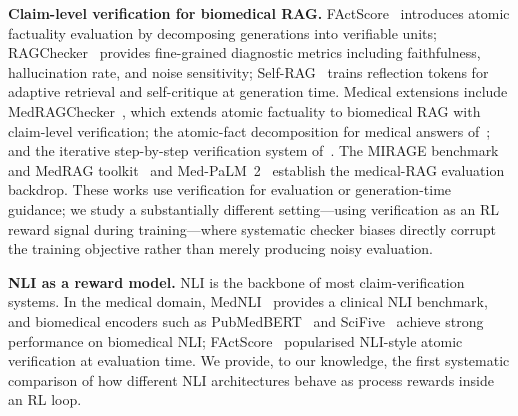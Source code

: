 \documentclass[11pt]{article}
\begin{document}
\textbf{Claim-level verification for biomedical RAG.}
FActScore~\citep{min2023factscore} introduces atomic
factuality evaluation by decomposing generations into
verifiable units;
RAGChecker~\citep{ru2024ragchecker} provides
fine-grained diagnostic metrics including
faithfulness, hallucination rate, and noise
sensitivity;
Self-RAG~\citep{asai2023self} trains reflection
tokens for adaptive retrieval and self-critique at
generation time.
Medical extensions include
MedRAGChecker~\citep{ji2026medragchecker}, which
extends atomic factuality to biomedical RAG with
claim-level verification; the atomic-fact
decomposition for medical answers
of~\citet{vladika2025atomic}; and the iterative
step-by-step verification system
of~\citet{vladika2025step}. The MIRAGE benchmark and
MedRAG toolkit~\citep{xiong2024benchmarking} and
Med-PaLM~2~\citep{singhal2025toward} establish the
medical-RAG evaluation backdrop. These works use
verification for evaluation or generation-time
guidance; we study a substantially different
setting---using verification as an RL reward signal
during training---where systematic checker biases
directly corrupt the training objective rather than
merely producing noisy evaluation.


\textbf{NLI as a reward model.}
NLI is the backbone of most claim-verification systems. In the medical domain, MedNLI~\citep{romanov2018lessons} provides a clinical NLI benchmark, and biomedical encoders such as PubMedBERT~\citep{gu2021domain} and SciFive~\citep{phan2021scifive} achieve strong performance on biomedical NLI; FActScore~\citep{min2023factscore} popularised NLI-style atomic verification at evaluation time. We provide, to our knowledge, the first systematic comparison of how different NLI architectures behave as process rewards inside an RL loop.

\end{document}

